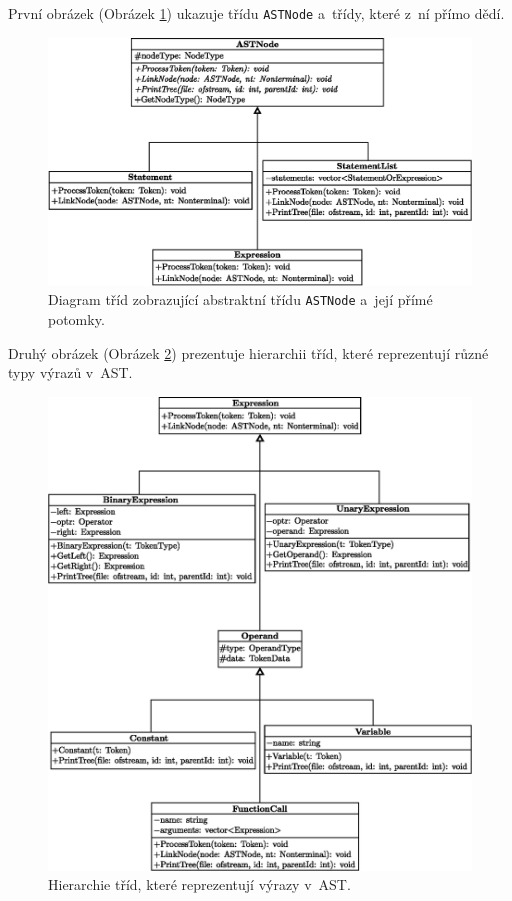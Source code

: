 První obrázek (Obrázek \ref{fig_hierarchie_astnode}) ukazuje třídu \texttt{ASTNode} a~třídy, které z~ní přímo dědí.
\begin{figure}[h]
	\centering
	\includegraphics[width=\textwidth]{obrazky-figures/ast_node_hierarchy.eps}
	\caption{Diagram tříd zobrazující abstraktní třídu \texttt{ASTNode} a~její přímé potomky.}
	\label{fig_hierarchie_astnode}
\end{figure}
\newpage

Druhý obrázek (Obrázek \ref{fig_hierarchie_expression}) prezentuje hierarchii tříd, které reprezentují různé typy výrazů v~AST. 
\begin{figure}[h]
	\centering
	\includegraphics[width=\textwidth]{obrazky-figures/expression_hierarchy.eps}
\caption{Hierarchie tříd, které reprezentují výrazy v~AST.}
	\label{fig_hierarchie_expression}
\end{figure}
\newpage

